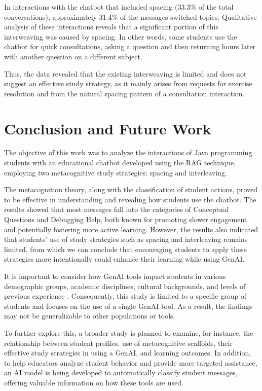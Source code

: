 \documentclass[a4paper,twoside]{article}
\begin{document}
In interactions with the chatbot that included spacing (33.3\% of the total
conversations), approximately 31.4\% of the messages switched topics.
Qualitative analysis of these interactions reveals that a significant portion
of this interweaving was caused by spacing. In other words, some students use
the chatbot for quick consultations, asking a question and then returning hours
later with another question on a different subject.

Thus, the data revealed that the existing interweaving is limited and does not
suggest an effective study strategy, as it mainly arises from requests for
exercise resolution and from the natural spacing pattern of a consultation
interaction.

\section{Conclusion and Future Work}

The objective of this work was to analyze the interactions of Java programming
students with an educational chatbot developed using the RAG technique, employing
two metacognitive study strategies: spacing and interleaving.

The metacognition theory, along with the classification of student actions,
proved to be effective in understanding and revealing how students use the chatbot.
The results showed that most messages fall into the categories of Conceptual
Questions and Debugging Help, both known for promoting slower engagement and
potentially fostering more active learning. However, the results also indicated
that students' use of study strategies such as spacing and interleaving remains
limited, from which we can conclude that encouraging students to apply these
strategies more intentionally could enhance their learning while using GenAI.

It is important to consider how GenAI tools impact students in various
demographic groups, academic disciplines, cultural backgrounds, and levels of
previous experience \citep{catalan21} \citep{neo22}. Consequently, this study is
limited to a specific group of students and focuses on the use of a single GenAI
tool. As a result, the findings may not be generalizable to other populations or
tools.

To further explore this, a broader study is planned to examine, for instance,
the relationship between student profiles, use of metacognitive scaffolds, their
effective study strategies in using a GenAI, and learning outcomes.
In addition, to help educators analyze student behavior and provide
more targeted assistance, an AI model is being developed to automatically
classify student messages, offering valuable information on how these tools are used.


{\small
}
\end{document}
